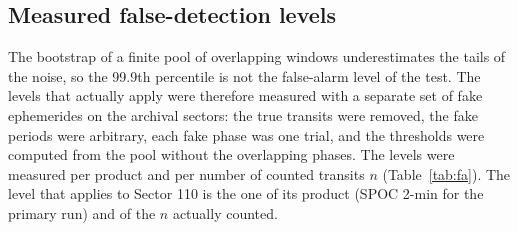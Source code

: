 \subsection{Measured false-detection levels} \label{app:fa}

The bootstrap of a finite pool of overlapping windows underestimates the tails of the noise, so the 99.9th percentile
is not the false-alarm level of the test. The levels that actually apply were therefore measured with a separate set of fake
ephemerides on the archival sectors: the true transits were removed, the fake periods were arbitrary, each fake phase
was one trial, and the thresholds were computed from the pool without the overlapping phases. The levels were measured
per product and per number of counted transits $n$ (Table~\ref{tab:fa}). The level that applies to Sector 110 is the
one of its product (SPOC 2-min for the primary run) and of the $n$ actually counted.

